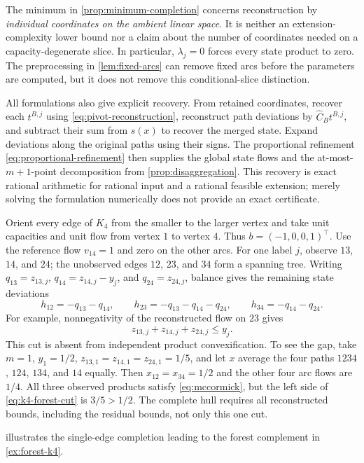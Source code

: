 The minimum in \cref{prop:minimum-completion} concerns reconstruction by
\emph{individual coordinates on the ambient linear space}. It is neither
an extension-complexity lower bound nor a claim about the number of
coordinates needed on a capacity-degenerate slice. In particular,
$\lambda_j=0$ forces every state product to zero. The preprocessing in
\cref{lem:fixed-arcs} can remove fixed arcs before the parameters are
computed, but it does not remove this conditional-slice distinction.

All formulations also give explicit recovery. From retained coordinates,
recover each $t^{B,j}$ using \eqref{eq:pivot-reconstruction}, reconstruct
path deviations by $\widehat C_Bt^{B,j}$, and subtract their sum from
$s(x)$ to recover the merged state. Expand deviations along the original
paths using their signs. The proportional refinement
\eqref{eq:proportional-refinement} then supplies the global state flows
and the at-most-$m+1$-point decomposition from
\cref{prop:disaggregation}. This recovery is exact rational arithmetic for
rational input and a rational feasible extension; merely solving the
formulation numerically does not provide an exact certificate.

\begin{example}\label{ex:forest-k4}
Orient every edge of $K_4$ from the smaller to the larger vertex and take
unit capacities and unit flow from vertex $1$ to vertex $4$. Thus
$b=(-1,0,0,1)^\top$. Use the reference flow $v_{14}=1$ and zero on the
other arcs. For one label $j$, observe $13$, $14$, and $24$; the unobserved
edges $12$, $23$, and $34$ form a spanning tree. Writing
$q_{13}=z_{13,j}$, $q_{14}=z_{14,j}-y_j$, and $q_{24}=z_{24,j}$, balance
gives the remaining state deviations
\[
 h_{12}=-q_{13}-q_{14},\qquad
 h_{23}=-q_{13}-q_{14}-q_{24},\qquad
 h_{34}=-q_{14}-q_{24}.
\]
For example, nonnegativity of the reconstructed flow on $23$ gives
\begin{equation}\label{eq:k4-forest-cut}
 z_{13,j}+z_{14,j}+z_{24,j}\le y_j.
\end{equation}
This cut is absent from independent product convexification. To see the
gap, take $m=1$, $y_1=1/2$, $z_{13,1}=z_{14,1}=z_{24,1}=1/5$, and let
$x$ average the four paths $1234$, $124$, $134$, and $14$ equally. Then
$x_{12}=x_{34}=1/2$ and the other four arc flows are $1/4$. All three
observed products satisfy \eqref{eq:mccormick}, but the left side of
\eqref{eq:k4-forest-cut} is $3/5>1/2$. The complete hull requires all
reconstructed bounds, including the residual bounds, not only this one cut.
\end{example}
 illustrates the single-edge completion
leading to the forest complement in \cref{ex:forest-k4}.

